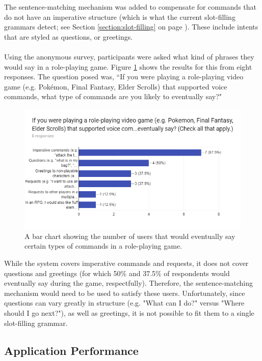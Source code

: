 \documentclass[11pt]{article}
\begin{document}
The sentence-matching mechanism was added to compensate for commands that do not have an imperative structure (which is what the current slot-filling grammars detect; see Section \ref{section:slot-filling} on page \pageref{section:slot-filling}). These include intents that are styled as questions, or greetings.
\\
\\
Using the anonymous survey, participants were asked what kind of phrases they would say in a role-playing game. Figure \ref{fig:survey-commands} shows the results for this from eight responses. The question posed was, ``If you were playing a role-playing video game (e.g. Pok\'emon, Final Fantasy, Elder Scrolls) that supported voice commands, what type of commands are you likely to eventually say?"

\begin{figure}[H]
\begin{center}
  \includegraphics[width=\linewidth]{survey-commands}
  \caption{A bar chart showing the number of users that would eventually say certain types of commands in a role-playing game.}
  \label{fig:survey-commands}
  \end{center}
\end{figure}

While the system covers imperative commands and requests, it does not cover questions and greetings (for which 50\% and 37.5\% of respondents would eventually say during the game, respectfully). Therefore, the sentence-matching mechanism would need to be used to satisfy these users. Unfortunately, since questions can vary greatly in structure (e.g. "What can I do?" versus "Where should I go next?"), as well as greetings, it is not possible to fit them to a single slot-filling grammar.

\subsection{Application Performance}
\label{section:profiling}
\end{document}
